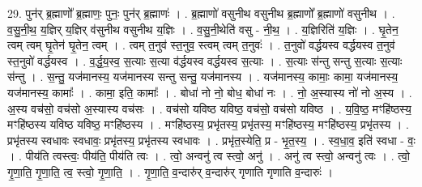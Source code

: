 \documentclass[17pt]{extarticle}
\begin{document}
29. पुन॑र् ब्र॒ह्माणो᳚ ब्र॒ह्माणः॒ पुनः॒ पुन॑र् ब्र॒ह्माणः॑ । . ब्र॒ह्माणो॑ वसुनीथ वसुनीथ ब्र॒ह्माणो᳚ ब्र॒ह्माणो॑ वसुनीथ । . व॒सु॒नी॒थ॒ य॒ज्ञिर् य॒ज्ञिर् व॑सुनीथ वसुनीथ य॒ज्ञिः । . व॒सु॒नी॒थेति॑ वसु - नी॒थ॒ । . य॒ज्ञिरिति॑ य॒ज्ञिः । . घृ॒तेन॒ त्वम् त्वम् घृ॒तेन॑ घृ॒तेन॒ त्वम् । . त्वम् त॒नुव॑ स्त॒नुव॒ स्त्वम् त्वम् त॒नुवः॑ । . त॒नुवो॑ वर्द्धयस्व वर्द्धयस्व त॒नुव॑ स्त॒नुवो॑ वर्द्धयस्व । . व॒र्द्ध॒य॒स्व॒ स॒त्याः स॒त्या व॑र्द्धयस्व वर्द्धयस्व स॒त्याः । . स॒त्याः स॑न्तु सन्तु स॒त्याः स॒त्याः स॑न्तु । . स॒न्तु॒ यज॑मानस्य॒ यज॑मानस्य सन्तु सन्तु॒ यज॑मानस्य । . यज॑मानस्य॒ कामाः॒ कामा॒ यज॑मानस्य॒ यज॑मानस्य॒ कामाः᳚ । . कामा॒ इति॒ कामाः᳚ । . बोधा॑ नो नो॒ बोध॒ बोधा॑ नः । . नो॒ अ॒स्यास्य नो॑ नो अ॒स्य । . अ॒स्य वच॑सो॒ वच॑सो अ॒स्यास्य वच॑सः । . वच॑सो यविष्ठ यविष्ठ॒ वच॑सो॒ वच॑सो यविष्ठ । . य॒वि॒ष्ठ॒ मꣳहि॑ष्ठस्य॒ मꣳहि॑ष्ठस्य यविष्ठ यविष्ठ॒ मꣳहि॑ष्ठस्य । . मꣳहि॑ष्ठस्य॒ प्रभृ॑तस्य॒ प्रभृ॑तस्य॒ मꣳहि॑ष्ठस्य॒ मꣳहि॑ष्ठस्य॒ प्रभृ॑तस्य । . प्रभृ॑तस्य स्वधावः स्वधावः॒ प्रभृ॑तस्य॒ प्रभृ॑तस्य स्वधावः । . प्रभृ॑त॒स्येति॒ प्र - भृ॒त॒स्य॒ । . स्व॒धा॒व॒ इति॑ स्वधा - वः॒ । . पीय॑ति त्वस्त्वः॒ पीय॑ति॒ पीय॑ति त्वः । . त्वो॒ अन्वनु॑ त्व स्त्वो॒ अनु॑ । . अनु॑ त्व स्त्वो॒ अन्वनु॑ त्वः । . त्वो॒ गृ॒णा॒ति॒ गृ॒णा॒ति॒ त्व॒ स्त्वो॒ गृ॒णा॒ति॒ । . गृ॒णा॒ति॒ व॒न्दारु॑र् व॒न्दारु॑र् गृणाति गृणाति व॒न्दारुः॑ । \newline
\end{document}
